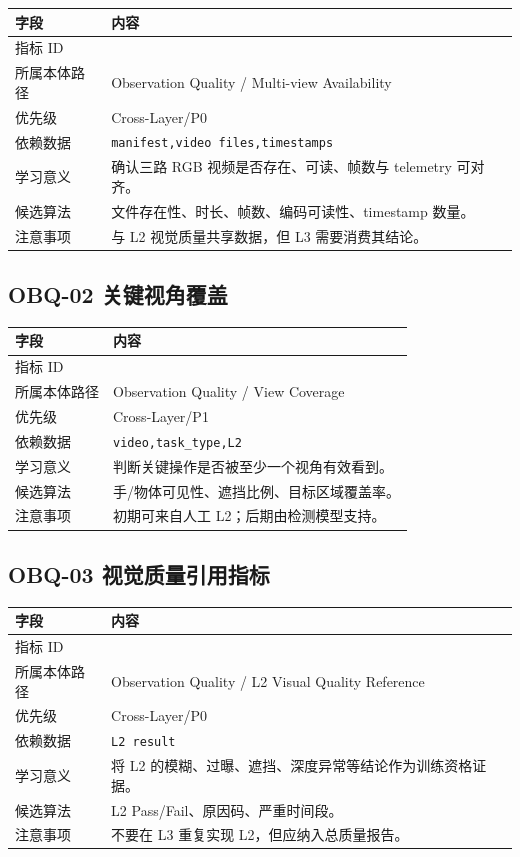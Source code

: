 \documentclass[UTF8,zihao=-4]{ctexart}
\newcommand{\Code}[1]{\texttt{#1}}
\newcommand{\MID}[1]{\texttt{\seqsplit{#1}}}
\begin{document}
\begin{longtable}{L{3.6cm} L{9.6cm}}
\toprule
字段 & 内容 \\
\midrule
指标 ID & \MID{OBQ-01} \\
所属本体路径 & Observation Quality / Multi-view Availability \\
优先级 & Cross-Layer/P0 \\
依赖数据 & \Code{manifest,video files,timestamps} \\
学习意义 & 确认三路 RGB 视频是否存在、可读、帧数与 telemetry 可对齐。 \\
候选算法 & 文件存在性、时长、帧数、编码可读性、timestamp 数量。 \\
注意事项 & 与 L2 视觉质量共享数据，但 L3 需要消费其结论。 \\
\bottomrule
\end{longtable}

\subsection{OBQ-02 关键视角覆盖}

\begin{longtable}{L{3.6cm} L{9.6cm}}
\toprule
字段 & 内容 \\
\midrule
指标 ID & \MID{OBQ-02} \\
所属本体路径 & Observation Quality / View Coverage \\
优先级 & Cross-Layer/P1 \\
依赖数据 & \Code{video,task\_type,L2} \\
学习意义 & 判断关键操作是否被至少一个视角有效看到。 \\
候选算法 & 手/物体可见性、遮挡比例、目标区域覆盖率。 \\
注意事项 & 初期可来自人工 L2；后期由检测模型支持。 \\
\bottomrule
\end{longtable}

\subsection{OBQ-03 视觉质量引用指标}

\begin{longtable}{L{3.6cm} L{9.6cm}}
\toprule
字段 & 内容 \\
\midrule
指标 ID & \MID{OBQ-03} \\
所属本体路径 & Observation Quality / L2 Visual Quality Reference \\
优先级 & Cross-Layer/P0 \\
依赖数据 & \Code{L2 result} \\
学习意义 & 将 L2 的模糊、过曝、遮挡、深度异常等结论作为训练资格证据。 \\
候选算法 & L2 Pass/Fail、原因码、严重时间段。 \\
注意事项 & 不要在 L3 重复实现 L2，但应纳入总质量报告。 \\
\bottomrule
\end{longtable}
\end{document}
